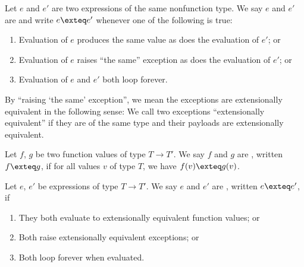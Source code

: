 \begin{definition}\label{sml-0008}%
\begin{node}\label{sml-0009}%
Let $e$ and $e'$ are two expressions of the same nonfunction type.
We say $e$ and $e'$ are  and write
$e\exteq e'$ whenever one of the following is true:
\begin{enumerate}
\item Evaluation of $e$ produces the same value as does the evaluation
  of $e'$; or
\item Evaluation of $e$ raises ``the same'' exception as does the evaluation
  of $e'$; or
\item Evaluation of $e$ and $e'$ both loop forever.
\end{enumerate}
By ``raising `the same' exception'', we mean the exceptions are
extensionally equivalent in the following sense:
We call two exceptions ``extensionally equivalent'' if they are of
the same type and their payloads are extensionally equivalent.
\end{node}

\begin{node}\label{sml-000A}%
Let $f$, $g$ be two function values of type $T\to T'$.
We say $f$ and $g$ are , written
$f\exteq g$, if for all values $v$ of type $T$, we have $f(v)\exteq g(v)$.
\end{node}

\begin{node}\label{sml-000B}%
Let $e$, $e'$ be expressions of type $T\to T'$. We say $e$ and $e'$ are
, written $e\exteq e'$, if
\begin{enumerate}
\item They both evaluate to extensionally equivalent function values; or
\item Both raise extensionally equivalent exceptions; or
\item Both loop forever when evaluated.
\end{enumerate}
\end{node}
\end{definition}

